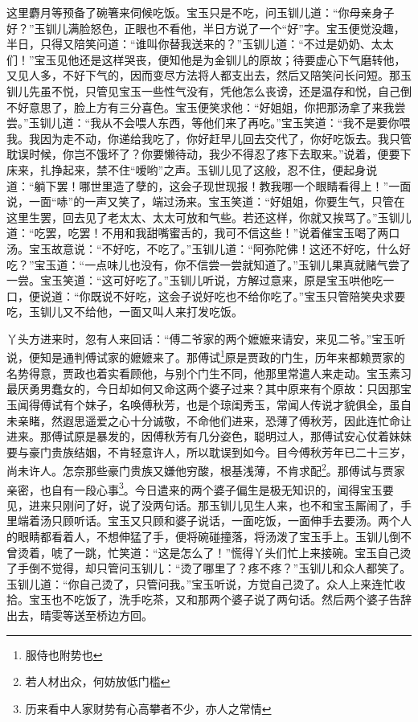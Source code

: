 \documentclass[12pt,oneside]{book}
\begin{document}
这里麝月等预备了碗箸来伺候吃饭。宝玉只是不吃，问玉钏儿道：“你母亲身子好？”玉钏儿满脸怒色，正眼也不看他，半日方说了一个“好”字。宝玉便觉没趣，半日，只得又陪笑问道：“谁叫你替我送来的？”玉钏儿道：“不过是奶奶、太太们！”宝玉见他还是这样哭丧，便知他是为金钏儿的原故；待要虚心下气磨转他，又见人多，不好下气的，因而变尽方法将人都支出去，然后又陪笑问长问短。那玉钏儿先虽不悦，只管见宝玉一些性气没有，凭他怎么丧谤，还是温存和悦，自己倒不好意思了，脸上方有三分喜色。宝玉便笑求他：“好姐姐，你把那汤拿了来我尝尝。”玉钏儿道：“我从不会喂人东西，等他们来了再吃。”宝玉笑道：“我不是要你喂我。我因为走不动，你递给我吃了，你好赶早儿回去交代了，你好吃饭去。我只管耽误时候，你岂不饿坏了？你要懒待动，我少不得忍了疼下去取来。”说着，便要下床来，扎挣起来，禁不住“嗳哟”之声。玉钏儿见了这般，忍不住，便起身说道：“躺下罢！哪世里造了孽的，这会子现世现报！教我哪一个眼睛看得上！”一面说，一面“哧”的一声又笑了，端过汤来。宝玉笑道：“好姐姐，你要生气，只管在这里生罢，回去见了老太太、太太可放和气些。若还这样，你就又挨骂了。”玉钏儿道：“吃罢，吃罢！不用和我甜嘴蜜舌的，我可不信这些！”说着催宝玉喝了两口汤。宝玉故意说：“不好吃，不吃了。”玉钏儿道：“阿弥陀佛！这还不好吃，什么好吃？”宝玉道：“一点味儿也没有，你不信尝一尝就知道了。”玉钏儿果真就赌气尝了一尝。宝玉笑道：“这可好吃了。”玉钏儿听说，方解过意来，原是宝玉哄他吃一口，便说道：“你既说不好吃，这会子说好吃也不给你吃了。”宝玉只管陪笑央求要吃，玉钏儿又不给他，一面又叫人来打发吃饭。

丫头方进来时，忽有人来回话：“傅二爷家的两个嬷嬷来请安，来见二爷。”宝玉听说，便知是通判傅试家的嬷嬷来了。那傅试\footnote{服侍也附势也}原是贾政的门生，历年来都赖贾家的名势得意，贾政也着实看顾他，与别个门生不同，他那里常遣人来走动。宝玉素习最厌勇男蠢女的，今日却如何又命这两个婆子过来？其中原来有个原故：只因那宝玉闻得傅试有个妹子，名唤傅秋芳，也是个琼闺秀玉，常闻人传说才貌俱全，虽自未亲睹，然遐思遥爱之心十分诚敬，不命他们进来，恐薄了傅秋芳，因此连忙命让进来。那傅试原是暴发的，因傅秋芳有几分姿色，聪明过人，那傅试安心仗着妹妹要与豪门贵族结姻，不肯轻意许人，所以耽误到如今。目今傅秋芳年已二十三岁，尚未许人。怎奈那些豪门贵族又嫌他穷酸，根基浅薄，不肯求配\footnote{若人材出众，何妨放低门槛}。那傅试与贾家亲密，也自有一段心事\footnote{历来看中人家财势有心高攀者不少，亦人之常情}。今日遣来的两个婆子偏生是极无知识的，闻得宝玉要见，进来只刚问了好，说了没两句话。那玉钏儿见生人来，也不和宝玉厮闹了，手里端着汤只顾听话。宝玉又只顾和婆子说话，一面吃饭，一面伸手去要汤。两个人的眼睛都看着人，不想伸猛了手，便将碗碰撞落，将汤泼了宝玉手上。玉钏儿倒不曾烫着，唬了一跳，忙笑道：“这是怎么了！”慌得丫头们忙上来接碗。宝玉自己烫了手倒不觉得，却只管问玉钏儿：“烫了哪里了？疼不疼？”玉钏儿和众人都笑了。玉钏儿道：“你自己烫了，只管问我。”宝玉听说，方觉自己烫了。众人上来连忙收拾。宝玉也不吃饭了，洗手吃茶，又和那两个婆子说了两句话。然后两个婆子告辞出去，晴雯等送至桥边方回。
\end{document}
